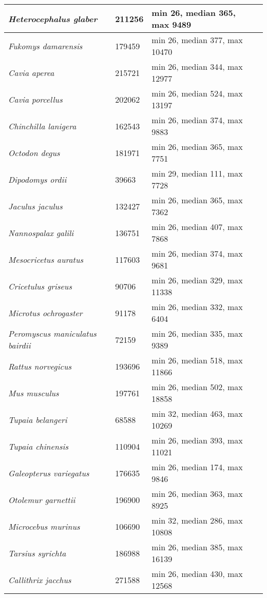 {\begin{longtable}{| L{4cm} | L{2cm}  | L{5cm} | L{4cm} |}
\textit{Heterocephalus glaber} & 211256 & min 26, median 365, max 9489 & \\ \hline
\textit{Fukomys damarensis} & 179459 & min 26, median 377, max 10470 & \\ \hline
\textit{Cavia aperea} & 215721 & min 26, median 344, max 12977 & \\ \hline
\textit{Cavia porcellus} & 202062 & min 26, median 524, max 13197 & \\ \hline
\textit{Chinchilla lanigera} & 162543 & min 26, median 374, max 9883 & \\ \hline
\textit{Octodon degus} & 181971 & min 26, median 365, max 7751 & \\ \hline
\textit{Dipodomys ordii} & 39663 & min 29, median 111, max 7728 & \\ \hline
\textit{Jaculus jaculus} & 132427 & min 26, median 365, max 7362 & \\ \hline
\textit{Nannospalax galili} & 136751 & min 26, median 407, max 7868 & \\ \hline
\textit{Mesocricetus auratus} & 117603 & min 26, median 374, max 9681 & \\ \hline
\textit{Cricetulus griseus} & 90706 & min 26, median 329, max 11338 & \\ \hline
\textit{Microtus ochrogaster} & 91178 & min 26, median 332, max 6404 & \\ \hline
\textit{Peromyscus maniculatus bairdii} & 72159 & min 26, median 335, max 9389 & \\ \hline
\textit{Rattus norvegicus} & 193696 & min 26, median 518, max 11866 & \\ \hline
\textit{Mus musculus} & 197761 & min 26, median 502, max 18858 & \\ \hline
\textit{Tupaia belangeri} & 68588 & min 32, median 463, max 10269 & \\ \hline
\textit{Tupaia chinensis} & 110904 & min 26, median 393, max 11021 & \\ \hline
\textit{Galeopterus variegatus} & 176635 & min 26, median 174, max 9846 & \\ \hline
\textit{Otolemur garnettii} & 196900 & min 26, median 363, max 8925 & \\ \hline
\textit{Microcebus murinus} & 106690 & min 32, median 286, max 10808 & \\ \hline
\textit{Tarsius syrichta} & 186988 & min 26, median 385, max 16139 & \\ \hline
\textit{Callithrix jacchus} & 271588 & min 26, median 430, max 12568 & \\ \hline

\end{longtable}}
